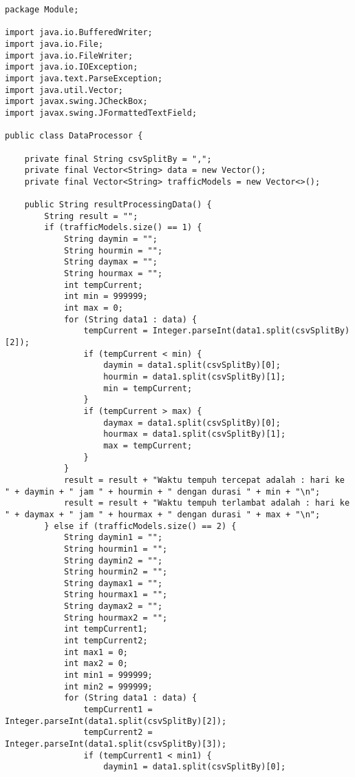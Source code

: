\begin{lstlisting}[caption= DataProcessor.java]
package Module;

import java.io.BufferedWriter;
import java.io.File;
import java.io.FileWriter;
import java.io.IOException;
import java.text.ParseException;
import java.util.Vector;
import javax.swing.JCheckBox;
import javax.swing.JFormattedTextField;

public class DataProcessor {

    private final String csvSplitBy = ",";
    private final Vector<String> data = new Vector();
    private final Vector<String> trafficModels = new Vector<>();

    public String resultProcessingData() {
        String result = "";
        if (trafficModels.size() == 1) {
            String daymin = "";
            String hourmin = "";
            String daymax = "";
            String hourmax = "";
            int tempCurrent;
            int min = 999999;
            int max = 0;
            for (String data1 : data) {
                tempCurrent = Integer.parseInt(data1.split(csvSplitBy)[2]);
                if (tempCurrent < min) {
                    daymin = data1.split(csvSplitBy)[0];
                    hourmin = data1.split(csvSplitBy)[1];
                    min = tempCurrent;
                }
                if (tempCurrent > max) {
                    daymax = data1.split(csvSplitBy)[0];
                    hourmax = data1.split(csvSplitBy)[1];
                    max = tempCurrent;
                }
            }
            result = result + "Waktu tempuh tercepat adalah : hari ke " + daymin + " jam " + hourmin + " dengan durasi " + min + "\n";
            result = result + "Waktu tempuh terlambat adalah : hari ke " + daymax + " jam " + hourmax + " dengan durasi " + max + "\n";
        } else if (trafficModels.size() == 2) {
            String daymin1 = "";
            String hourmin1 = "";
            String daymin2 = "";
            String hourmin2 = "";
            String daymax1 = "";
            String hourmax1 = "";
            String daymax2 = "";
            String hourmax2 = "";
            int tempCurrent1;
            int tempCurrent2;
            int max1 = 0;
            int max2 = 0;
            int min1 = 999999;
            int min2 = 999999;
            for (String data1 : data) {
                tempCurrent1 = Integer.parseInt(data1.split(csvSplitBy)[2]);
                tempCurrent2 = Integer.parseInt(data1.split(csvSplitBy)[3]);
                if (tempCurrent1 < min1) {
                    daymin1 = data1.split(csvSplitBy)[0];

\end{lstlisting}
